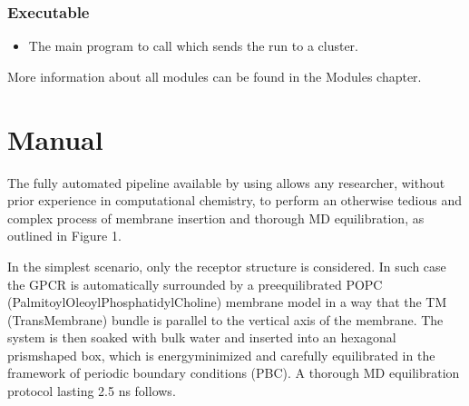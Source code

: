 \documentclass[letterpaper,10pt,english]{sphinxmanual}
\begin{document}
\subsection{Executable}
\label{\detokenize{installation:executable}}\begin{itemize}
\item {} 
\sphinxAtStartPar
{} The main program to call which sends the run to a
cluster.

\end{itemize}

\sphinxAtStartPar
More information about all modules can be found in the Modules chapter.

\sphinxstepscope


\chapter{Manual}
\label{\detokenize{manual:manual}}\label{\detokenize{manual::doc}}
\sphinxAtStartPar
The fully automated pipeline available by using  allows any
researcher, without prior experience in computational chemistry, to
perform an otherwise tedious and complex process of membrane insertion
and thorough MD equilibration, as outlined in Figure 1.

\noindent{}

\sphinxAtStartPar
In the simplest scenario, only the receptor structure is considered. In
such case the GPCR is automatically surrounded by a pre\sphinxhyphen{}equilibrated
POPC (Palmitoyl\sphinxhyphen{}Oleoyl\sphinxhyphen{}Phosphatidyl\sphinxhyphen{}Choline) membrane model in a way
that the TM (Trans\sphinxhyphen{}Membrane) bundle is parallel to the vertical axis of
the membrane. The system is then soaked with bulk water and inserted
into an hexagonal prism\sphinxhyphen{}shaped box, which is energy\sphinxhyphen{}minimized and
carefully equilibrated in the framework of periodic boundary conditions
(PBC). A thorough MD equilibration protocol lasting 2.5 ns follows.
\end{document}
